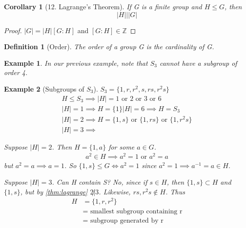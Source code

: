 \documentclass[11pt, oneside]{book}
\theoremstyle{break}
\newtheorem*{proof}{Proof}
\newtheorem{crly}{Corollary}[section]
\newtheorem{defn}{Definition}[section]
\newtheorem{eg}{Example}[section]
\newcommand{\bb}[1]{\mathbb{#1}}			%
\begin{document}
\begin{crly}[12. Lagrange's Theorem]\label{thm:lagrange}
    If G is a finite group and $H \leq G$, then
    \begin{equation}
        |H| \Big| |G|
    \end{equation}
\end{crly}

\begin{proof}
    $|G| = |H|[G : H]$ and $[G : H] \in \bb{Z}$
\end{proof}

\begin{defn}[Order]
    The order of a group G is the cardinality of G.
\end{defn}

\begin{eg}
    In our previous example, note that $S_3$ cannot have a subgroup of order 4.
\end{eg}

\begin{eg}[Subgroups of $S_3$]
    $S_3 = \{1, r, r^2, s, rs, r^2s\}$
    \begin{gather*}
        H \leq S_3 \implies |H| = 1 \text{ or } 2 \text{ or } 3 \text{ or } 6 \\
        |H| = 1 \implies H =\{1\}
        |H| = 6 \implies H = S_3 \\
        |H| = 2 \implies H = \{1,s\} \text{ or } \{1, rs\} \text{ or } \{1, r^2s\} \\
        |H| = 3 \implies 
    \end{gather*}

    Suppose $|H| = 2$. Then $H = \{1, a\}$ for some $a \in G$.
    \begin{gather*}
        a^2 \in H \implies a^2 = 1 \text{ or } a^2 = a 
    \end{gather*}
    but $a^2 = a \implies a = 1$.
    So $\{1, s\} \leq G \iff a^2 = 1$ since $a^2 = 1 \implies a^{-1} = a \in H$.

    Suppose $|H| = 3$. Can H contain S? No, since if $s \in H$, then $\{1, s\} \subset H$ and $\{1, s\}$, but by \autoref{thm:lagrange} $2 \not| 3$. Likewise, $rs, r^2 s \notin H$. Thus
    \begin{align*}
        H &= \{1, r, r^2\} \\
         &= \text{ smallest subgroup containing r} \\
         &= \text{ subgroup generated by r}
    \end{align*}
\end{eg}
\end{document}
